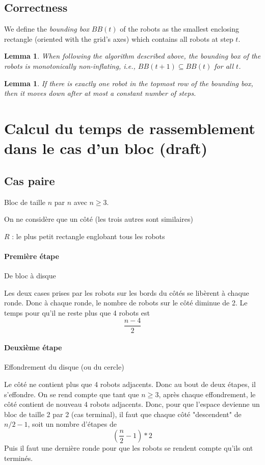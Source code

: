 \documentclass[11pt, a4paper]{article}
\theoremstyle{plain}
\newtheorem{lem}[thm]{Lemma}
\theoremstyle{definition}
\theoremstyle{remark}
\begin{document}
\subsection{Correctness}

We define the \textit{bounding box} $BB(t)$ of the robots as the smallest
enclosing rectangle (oriented with the grid's axes) which contains all robots
at step $t$.

\begin{lem}
When following the algorithm described above, the bounding box of the robots is
monotonically non-inflating, i.e., $BB(t+1) \subseteq BB(t)$ for all $t$.
\end{lem}

\begin{lem}
If there is exactly one robot in the topmost row of the bounding box, then it
moves down after at most a constant number of steps.
\end{lem}

\section{Calcul du temps de rassemblement dans le cas d'un bloc (draft)}

\subsection{Cas paire}

Bloc de taille $n$ par $n$ avec $n \geq 3$.

On ne considère que un côté (les trois autres sont similaires)

$R$ : le plus petit rectangle englobant tous les robots

\paragraph{Première étape} De bloc à disque

Les deux cases prises par les robots sur les bords du côtés se libèrent à
chaque ronde. Donc à chaque ronde, le nombre de robots sur le côté diminue de
2. Le temps pour qu'il ne reste plus que 4 robots est
\[ \frac{n-4}{2} \]

\paragraph{Deuxième étape} Effondrement du disque (ou du cercle)

Le côté ne contient plus que 4 robots adjacents. Donc au bout de deux
étapes, il s'effondre. On se rend compte que tant que $n \geq 3$,
après chaque effondrement, le côté contient de nouveau 4 robots adjacents. Donc,
pour que l'espace devienne un bloc de taille 2 par 2 (cas terminal), il faut
que chaque côté "descendent" de $n/2-1$, soit un nombre d'étapes de
\[ ( \frac{n}{2} -1 ) *2 \]
Puis il faut une dernière ronde pour que les robots se rendent compte qu'ils
ont terminés.
\end{document}
